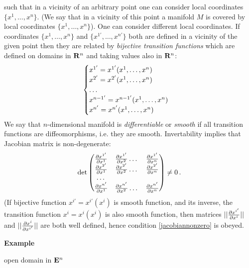 \documentclass[12pt]{article}
\theoremstyle{theorem}
\numberwithin{equation}{section}
\begin{document}
such that in a vicinity of an
arbitrary  point
one can consider local coordinates 
$\{x^1,\dots,x^n\}$.
(We say that in a vicinity of this point
a manifold $M$ is covered by local 
coordinates $\{x^1,\dots,x^n\}$).
One can consider different local coordinates.
If coordinates $\{x^1,\dots,x^n\}$ and 
$\{x^{1'},\dots,x^{n'}\}$ 
both are defined in a vicinity of the given point
then they are related by  {\it bijective transition functions} 
which are  defined on domains in ${\bf R}^n$ and 
taking values also in ${\bf R}^n$:
              \begin{equation}
        \label{changingofcoordinates}
             \begin{cases}
             x^{1'}=x^{1'}(x^1,\dots,x^n)\cr
             x^{2'}=x^{2'}(x^1,\dots,x^n)\cr
                \dots\cr
            x^{{n-1}'}=x^{{n-1}'}(x^1,\dots,x^n)\cr
              x^{{n}'}=x^{{n}'}(x^1,\dots,x^n)\cr
             \end{cases}
              \end{equation}
 We say that $n$-dimensional
manifold is {\it differentiable} or {\it smooth} 
if all transition functions are diffeomorphisms,
i.e. they are smooth.
  Invertability implies that  Jacobian matrix is non-degenerate:
              \begin{equation}\label{jacobiannonzero}
      \det
          \begin{pmatrix}
          {\partial x^{1'}\over \partial x^1} &{\partial x^{1'}\over \partial x^2}\dots &{\partial x^{1'}\over \partial x^n}\cr
         {\partial x^{2'}\over \partial x^1} &{\partial x^{2'}\over \partial x^2} \dots &{\partial x^{2'}\over \partial x^n}\cr
                           \dots\cr
      {\partial x^{n'}\over \partial x^1} &{\partial x^{n'}\over \partial x^2}\dots &{\partial x^{n'}\over \partial x^n}\cr
          \end{pmatrix}\not=0\,.
              \end{equation}
 (If bijective function $x^{i'}=x^{i'}(x^i)$ is smooth function,
and its inverse, the transition function $x^{i}=x^{i}(x^i)$  
is also smooth function, then
matrices  $||{\partial x^{i'}\over \partial x^i}||$ and
$||{\partial x^i\over \partial x^{i'}}||$  
are both well defined, hence condition
\eqref{jacobiannonzero} is obeyed.
 
\m

{\bf Example}
    
  \centerline {open domain in ${\bf E}^n$}
\end{document}
